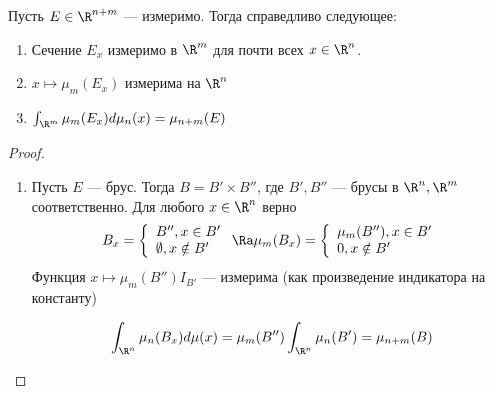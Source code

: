 \begin{theorem}
    Пусть \(E \in \R^{n + m}\) --- измеримо. Тогда справедливо следующее:
    \begin{enumerate}
        \item Сечение \(E_x\) измеримо в \(\R^m\) для почти всех \(x \in \R^n\).
        \item \(x \mapsto \mu_m(E_x)\) измерима на \(\R^n\)
        \item \(\int_{\R^m}\mu_m(E_x)d\mu_n(x) = \mu_{n + m}(E)\)
    \end{enumerate}
\end{theorem}
\begin{proof}
    \begin{enumerate}
        \item Пусть \(E\) --- брус. Тогда \(B = B' \times B''\), где \(B', B''\) --- брусы в \(\R^n, \R^m\) соответственно. Для любого \(x \in \R^n\) верно 
        \[B_x = \left\{\begin{array}{ll}
            B'', x \in B' \\
            \emptyset, x \notin B'
        \end{array}\right. \Ra \mu_m(B_x) = \left\{\begin{array}{ll}
            \mu_m(B''), x \in B' \\
            0, x \notin B'
        \end{array}\right.\]
        Функция \(x \mapsto \mu_m(B'') I_{B'}\) --- измерима (как произведение индикатора на константу)

        \[\int_{\R^n} \mu_n(B_x) d\mu(x) = \mu_m(B'')\int_{\R^n}\mu_n(B') = \mu_{n + m}(B)\]


\end{enumerate}
\end{proof}
